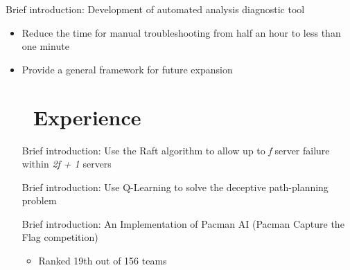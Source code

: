 \documentclass{resume}
\begin{document}
Brief introduction: Development of automated analysis diagnostic tool
\begin{itemize}
  \item Reduce the time for manual troubleshooting from half an hour to less than one minute
  \item Provide a general framework for future expansion

\section{\faUsers\ Experience}

Brief introduction: Use the Raft algorithm to allow up to \textit{f} server failure within \textit{2f + 1} servers




Brief introduction: Use Q-Learning to solve the deceptive path-planning problem




Brief introduction: An Implementation of Pacman AI (Pacman Capture the Flag competition)
\begin{itemize}
  \item Ranked 19th out of 156 teams
\end{itemize}



\end{itemize}
\end{document}
